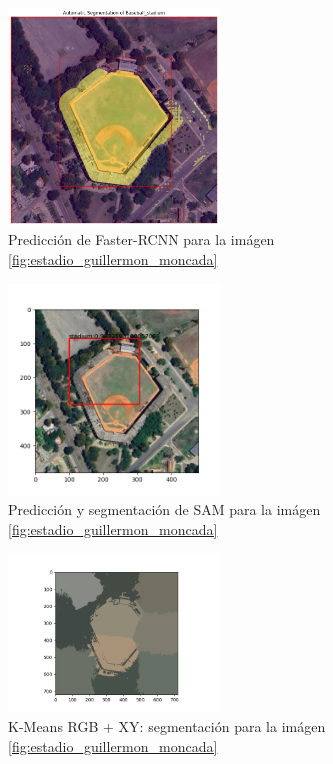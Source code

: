 \documentclass[article]{llncs}
\begin{document}
\begin{figure}[h]
  \centering
  \includegraphics[width=0.5\textwidth]{SAM.png}
  \caption{Predicci\'on de Faster-RCNN para la im\'agen \ref{fig:estadio_guillermon_moncada}}
  \label{fig:Figure_1}
\end{figure}

\begin{figure}[h]
    \centering
    \includegraphics[width=0.5\textwidth]{Figure_1.png}
    \caption{Predicci\'on y segmentaci\'on de SAM para la im\'agen \ref{fig:estadio_guillermon_moncada}}
    \label{fig:SAM}
\end{figure}

\begin{figure}[h]
  \centering
  \includegraphics[width=0.5\textwidth]{Figure_2.png}
  \caption{K-Means RGB + XY: segmentación para la im\'agen \ref{fig:estadio_guillermon_moncada}}
  \label{fig:Figure_2}
\end{figure}
\end{document}
